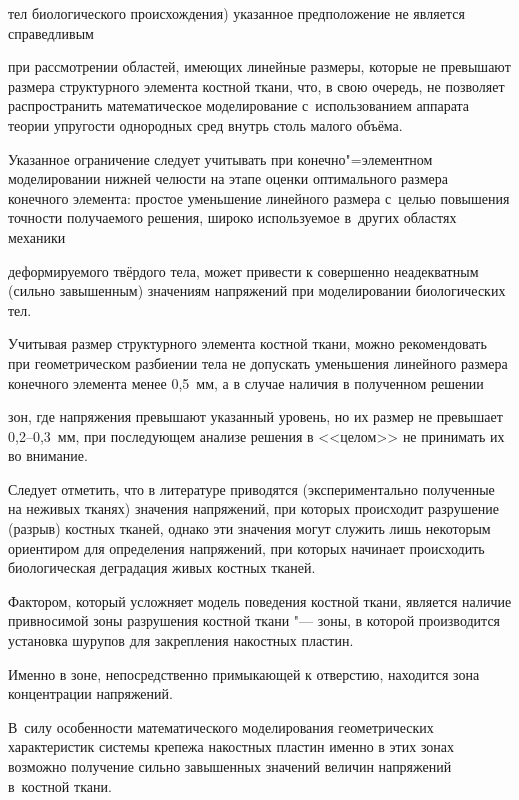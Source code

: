\noindent тел биологического происхождения) указанное предположение не является справедливым

при рассмотрении областей, имеющих линейные размеры, которые не превышают размера структурного элемента костной ткани, что, в свою очередь, не позволяет распространить  математическое моделирование с~использованием  аппарата теории упругости однородных сред внутрь столь малого объёма.

Указанное ограничение следует учитывать при конечно"=элементном моделировании нижней челюсти на этапе оценки оптимального размера конечного элемента: простое уменьшение  линейного размера с~целью повышения точности получаемого решения, широко используемое в~других областях механики 

деформируемого твёрдого тела, может привести к совершенно неадекватным (сильно завышенным) значениям напряжений при моделировании биологических тел.

Учитывая размер структурного элемента костной ткани, можно рекомендовать при геометрическом разбиении тела не допускать уменьшения линейного размера конечного элемента менее 0,5~мм, а в случае наличия в  полученном  решении

зон, где напряжения превышают указанный уровень, но их размер не превышает 0,2--0,3~мм, при последующем анализе решения в <<целом>> не принимать их во внимание.



Следует отметить, что  в литературе приводятся (экспериментально полученные на неживых тканях) значения напряжений, при которых происходит разрушение (разрыв) костных тканей, однако эти значения могут служить лишь некоторым ориентиром для определения напряжений, при которых начинает происходить биологическая деградация  живых костных тканей.



Фактором, который усложняет модель поведения костной ткани,  является наличие привносимой зоны разрушения костной ткани "--- зоны,  в которой производится установка шурупов для закрепления накостных пластин. 

Именно в зоне, непосредственно примыкающей к отверстию, находится зона концентрации напряжений. 

В~силу особенности математического моделирования  геометрических характеристик системы крепежа накостных пластин именно в этих зонах  возможно получение сильно завышенных значений  величин напряжений в~костной ткани.







